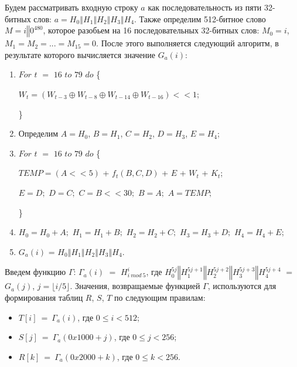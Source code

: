 \documentclass{./civarticle}
\begin{document}
Будем рассматривать входную строку $a$ как последовательность из пяти 32-битных слов: $a = H_0\mathbin\Vert H_1 \mathbin\Vert H_2 \mathbin\Vert H_3 \mathbin\Vert H_4$. Также определим 512-битное слово $M = i \mathbin\Vert 0^{480}$, которое разобьем на 16 последовательных 32-битных слов: $M_0 = i$, $M_1 = M_2 = ... = M_{15} = 0$. После этого выполняется следующий алгоритм, в результате которого вычисляется значение $G_a(i)$:
\begin{enumerate}
    \item $For$ $t$ $=$ $16$ $to$ $79$ $do$ \{ 
    
    \hspace{0.5cm}$W_t = (W_{t-3} \oplus W_{t-8} \oplus W_{t-14} \oplus W_{t-16}) << 1$;
    
    \}
    \item Определим $A = H_0$, $B = H_1$, $C = H_2$, $D = H_3$, $E = H_4$;
    \item $For$ $t$ $=$ $16$ $to$ $79$ $do$ \{
    
    \hspace{0.5cm}$TEMP = (A << 5)$ + $f_t(B, C, D)$ + $E$ + $W_t$ + $K_t$;
    
    \hspace{0.5cm}$E = D;$ $D = C;$ $C = B << 30;$ $B = A;$ $A = TEMP;$
    
    \}
    \item $H_0 = H_0 + A;$ $H_1 = H_1 + B;$ $H_2 = H_2 + C;$ $H_3 = H_3 + D;$ $H_4 = H_4 + E$;
    \item $G_a(i)$ = $H_0 \mathbin\Vert H_1 \mathbin\Vert H_2 \mathbin\Vert H_3 \mathbin\Vert H_4$.
\end{enumerate}

Введем функцию $\Gamma$: $\Gamma_a(i)$ $=$ $H_{i~mod~5}^i$, где $H_0^{5j} \mathbin\Vert  H_1^{5j + 1} \mathbin\Vert H_2^{5j + 2} \mathbin\Vert H_3^{5j + 3} \mathbin\Vert H_4^{5j + 4}$ $=$ $G_a(j)$, $j = \lfloor i/5 \rfloor$. Значения, возвращаемые функцией $\Gamma$, используются для формирования таблиц $R$, $S$, $T$ по следующим правилам:
\begin{itemize}
    \item $T[i]~=~\Gamma_a(i)$, где $0 \leq i < 512$;
    \item $S[j]~=~\Gamma_a(0x1000 + j)$, где $0 \leq j < 256$;
    \item $R[k]~=~\Gamma_a(0x2000 + k)$, где $0 \leq k < 256$.
\end{itemize}
\end{document}
